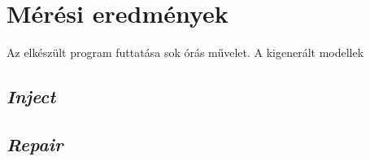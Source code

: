 \chapter{Mérési eredmények}

Az elkészült program futtatása sok órás művelet. A kigenerált modellek 

\section{\emph{Inject}}



\section{\emph{Repair}}

